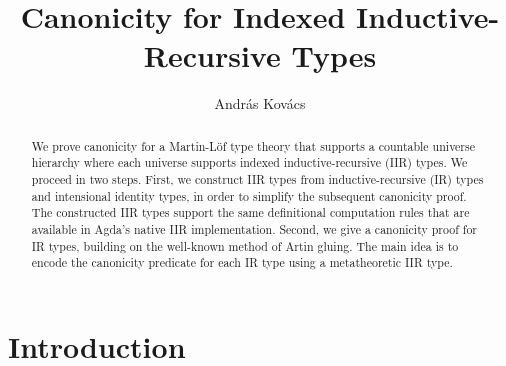 \documentclass[acmsmall,screen,review,anonymous]{acmart}
\begin{document}
\title{Canonicity for Indexed Inductive-Recursive Types}

\author{András Kovács}


\begin{abstract}
We prove canonicity for a Martin-Löf type theory that supports a countable universe hierarchy where
each universe supports indexed inductive-recursive (IIR) types. We proceed in two steps. First, we
construct IIR types from inductive-recursive (IR) types and intensional identity types, in order to
simplify the subsequent canonicity proof. The constructed IIR types support the same definitional
computation rules that are available in Agda's native IIR implementation. Second, we give a
canonicity proof for IR types, building on the well-known method of Artin gluing. The main idea is
to encode the canonicity predicate for each IR type using a metatheoretic IIR type.
\end{abstract}


\maketitle

\section{Introduction}\label{sec:introduction}
\end{document}
